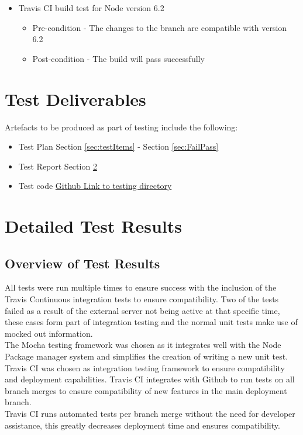 \documentclass{article}
\begin{document}
\begin{itemize}
\item Travis CI build test for Node version 6.2
	\begin{itemize}
	\item Pre-condition - The changes to the branch are compatible with version 6.2
	\item Post-condition - The build will pass successfully 
	\end{itemize}

\end{itemize}


\section{Test Deliverables}
Artefacts to be produced as part of testing include the following:
\begin{itemize}
\item Test Plan Section \ref{sec:testItems} - Section \ref{sec:FailPass}
\item Test Report Section \ref{sec:testReport}
\item Test code \href{https://github.com/QuintonWeenink/ValknutSolutions/tree/develop/test}{Github Link to testing directory}
\end{itemize}
\clearpage
\section{Detailed Test Results}\label{sec:testReport}
\subsection{Overview of Test Results}
All tests were run multiple times to ensure success with the inclusion of the Travis Continuous integration tests to ensure compatibility. Two of the tests failed as a result of the external server not being active at that specific time, these cases form part of integration testing and the normal unit tests make use of mocked out information.\\
The Mocha testing framework was chosen as it integrates well with the Node Package manager system and 
simplifies the creation of writing a new unit test.\\
Travis CI was chosen as integration testing framework to ensure compatibility and deployment capabilities. Travis CI integrates with Github to run tests on all branch merges to ensure compatibility of new features in the main deployment branch.\\
Travis CI runs automated tests per branch merge without the need for developer assistance, this greatly decreases deployment time and ensures compatibility.
\end{document}
